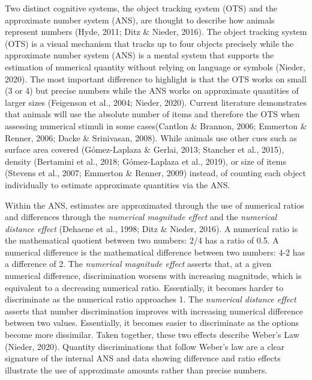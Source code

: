 \documentclass[
  english,
  ,doc,floatsintext]{apa6}
\begin{document}
Two distinct cognitive systems, the object tracking system (OTS) and the approximate number system (ANS), are thought to describe how animals represent numbers (Hyde, 2011; Ditz \& Nieder, 2016). The object tracking system (OTS) is a visual mechanism that tracks up to four objects precisely while the approximate number system (ANS) is a mental system that supports the estimation of numerical quantity without relying on language or symbols (Nieder, 2020). The most important difference to highlight is that the OTS works on small (3 or 4) but precise numbers while the ANS works on approximate quantities of larger sizes (Feigenson et al., 2004; Nieder, 2020). Current literature demonstrates that animals will use the absolute number of items and therefore the OTS when assessing numerical stimuli in some cases(Cantlon \& Brannon, 2006; Emmerton \& Renner, 2006; Dacke \& Srinivasan, 2008). While animals use other cues such as surface area covered (Gómez-Laplaza \& Gerlai, 2013; Stancher et al., 2015), density (Bertamini et al., 2018; Gómez-Laplaza et al., 2019), or size of items (Stevens et al., 2007; Emmerton \& Renner, 2009) instead, of counting each object individually to estimate approximate quantities via the ANS.

Within the ANS, estimates are approximated through the use of numerical ratios and differences through the \emph{numerical magnitude effect} and the \emph{numerical distance effect} (Dehaene et al., 1998; Ditz \& Nieder, 2016). A numerical ratio is the mathematical quotient between two numbers: 2/4 has a ratio of 0.5. A numerical difference is the mathematical difference between two numbers: 4-2 has a difference of 2. The \emph{numerical magnitude effect} asserts that, at a given numerical difference, discrimination worsens with increasing magnitude, which is equivalent to a decreasing numerical ratio. Essentially, it becomes harder to discriminate as the numerical ratio approaches 1. The \emph{numerical distance effect} asserts that number discrimination improves with increasing numerical difference between two values. Essentially, it becomes easier to discriminate as the options become more dissimilar. Taken together, these two effects describe Weber's Law (Nieder, 2020). Quantity discriminations that follow Weber's law are a clear signature of the internal ANS and data showing difference and ratio effects illustrate the use of approximate amounts rather than precise numbers.
\end{document}
